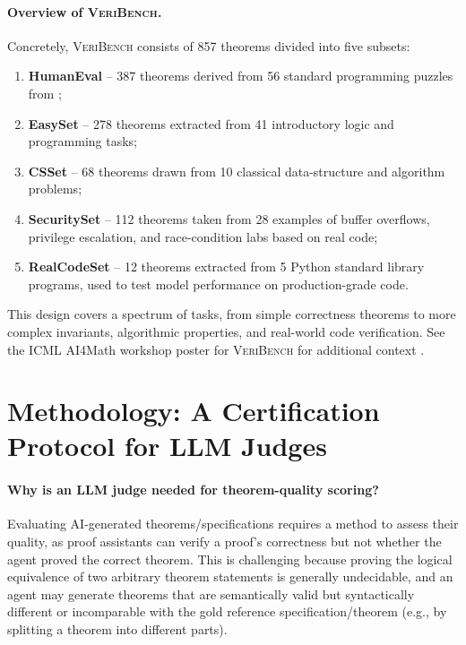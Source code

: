 \documentclass{article}
\begin{document}
\paragraph{Overview of \textsc{VeriBench}.}
Concretely, \textsc{VeriBench} consists of 857 theorems divided into five subsets:
\begin{enumerate}
    \item \textbf{HumanEval} -- 387 theorems derived from 56 standard programming puzzles from \citet{chen2021evaluating};
    \item \textbf{EasySet} -- 278 theorems extracted from 41 introductory logic and programming tasks;
    \item \textbf{CSSet} -- 68 theorems drawn from 10 classical data-structure and algorithm problems;
    \item \textbf{SecuritySet} -- 112 theorems taken from 28 examples of buffer overflows, privilege escalation, and race-condition labs based on real code;
    \item \textbf{RealCodeSet} -- 12 theorems extracted from 5 Python standard library programs, used to test model performance on production-grade code.
\end{enumerate}
This design covers a spectrum of tasks, from simple correctness theorems to more complex invariants, algorithmic properties, and real-world code verification. See the ICML AI4Math workshop poster for \textsc{VeriBench} for additional context \citep{veribench_icml25}.

\section{Methodology: A Certification Protocol for LLM Judges}

\paragraph{Why is an LLM judge needed for theorem-quality scoring?}
Evaluating AI-generated theorems/specifications requires a method to assess their quality, as proof assistants can verify a proof's correctness but not whether the agent proved the correct theorem.
This is challenging because proving the logical equivalence of two arbitrary theorem statements is generally undecidable, and an agent may generate theorems that are semantically valid but syntactically different or incomparable with the gold reference specification/theorem (e.g., by splitting a theorem into different parts).
\end{document}

